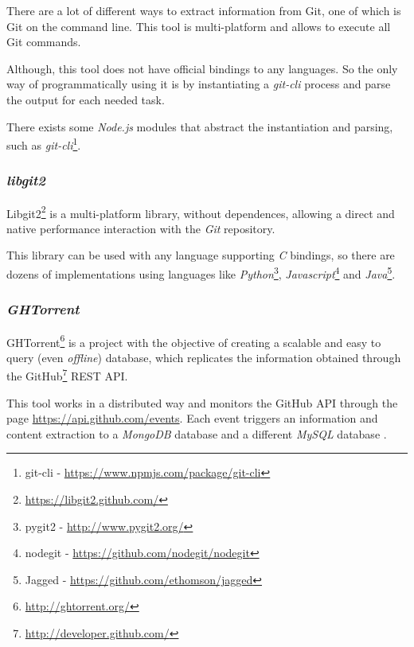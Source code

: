 There are a lot of different ways to extract information from Git, one of which is Git on the command line. This tool is multi-platform and allows to execute all Git commands.

Although, this tool does not have official bindings to any languages. So the only way of programmatically using it is by instantiating a \emph{git-cli} process and parse the output for each needed task.

There exists some \emph{Node.js} modules that abstract the instantiation and parsing, such as \emph{git-cli}\footnote{git-cli - \url{https://www.npmjs.com/package/git-cli}}.

\subsubsection{\emph{libgit2}}

Libgit2\footnote{\url{https://libgit2.github.com/}} is a multi-platform library, without dependences, allowing a direct and native performance interaction with the \emph{Git} repository.

This library can be used with any language supporting \emph{C} bindings, so there are dozens of implementations using languages like \emph{Python}\footnote{pygit2 - \url{http://www.pygit2.org/}}, \emph{Javascript}\footnote{nodegit - \url{https://github.com/nodegit/nodegit}} and \emph{Java}\footnote{Jagged - \url{https://github.com/ethomson/jagged}}.

\subsubsection{\emph{GHTorrent}}

GHTorrent\footnote{\url{http://ghtorrent.org/}} is a project with the objective of creating a scalable and easy to query (even \emph{offline}) database, which replicates the information obtained through the GitHub\footnote{\url{http://developer.github.com/}} REST API.

This tool works in a distributed way and monitors the GitHub API through the page \url{https://api.github.com/events}. Each event triggers an information and content extraction to a \emph{MongoDB} database and a different \emph{MySQL} database \cite{Gousios2012}.